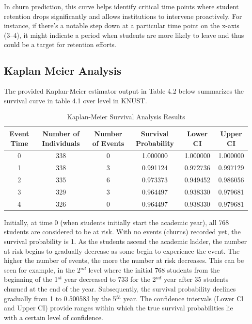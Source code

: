 \documentclass[doublespacing]{report} %
\begin{document}
In churn prediction, this curve helps identify critical time points where student retention drops significantly and allows institutions to intervene proactively. For instance, if there’s a notable step down at a particular time point on the x-axis (3–4), it might indicate a period when students are more likely to leave and thus could be a target for retention efforts.



\subsection{Kaplan Meier Analysis}

The provided Kaplan-Meier estimator output in Table 4.2 below summarizes the survival curve in table 4.1 over level in KNUST.

\begin{table}[ht]
    \centering
    \begin{tabular}{cccccc}
        \toprule
        Event Time & Number of Individuals & Number of Events & Survival Probability & Lower CI & Upper CI \\
        \midrule
        0 & 338 & 0 & 1.000000 & 1.000000 & 1.000000 \\
        1 & 338 & 3 & 0.991124 & 0.972736 & 0.997129 \\
        2 & 335 & 6 & 0.973373 & 0.949452 & 0.986056 \\
        3 & 329 & 3 & 0.964497 & 0.938330 & 0.979681 \\
        4 & 326 & 0 & 0.964497 & 0.938330 & 0.979681 \\
        \bottomrule
    \end{tabular}
    \caption{Kaplan-Meier Survival Analysis Results}
    \label{tab:km_results}
\end{table}


Initially, at time 0 (when students initially start the academic year), all 768 students are considered to be at risk. With no events (churns) recorded yet, the survival probability is 1.
As the students ascend the academic ladder, the number at risk begins to gradually decrease as some begin to experience the event. The higher the number of events, the more the number at risk decreases. This can be seen for example, in the 2\(^{nd}\)  level where the initial 768 students from the beginning of the 1\(^{st}\) year decreased to 733 for the 2\(^{nd}\) year after 35 students churned at the end of the year. Subsequently, the survival probability declines gradually from 1 to 0.500583 by the 5\(^{th}\) year. The confidence intervals (Lower Cl and Upper CI) provide ranges within which the true survival probabilities lie with a certain level of confidence.
\end{document}

